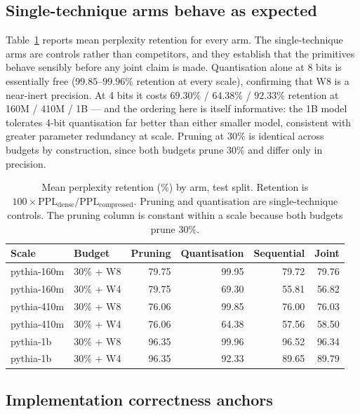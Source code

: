\subsection{Single-technique arms behave as expected}
\label{subsec:singletech}

Table~\ref{tab:retention} reports mean perplexity retention for every arm. The
single-technique arms are controls rather than competitors, and they establish that the
primitives behave sensibly before any joint claim is made. Quantisation alone at 8 bits is
essentially free ($99.85$--$99.96\%$ retention at every scale), confirming that W8 is a
near-inert precision. At 4 bits it costs $69.30\%$ / $64.38\%$ / $92.33\%$ retention at
160M / 410M / 1B --- and the ordering here is itself informative: the 1B model tolerates
4-bit quantisation far better than either smaller model, consistent with greater parameter
redundancy at scale. Pruning at $30\%$ is identical across budgets by construction, since
both budgets prune $30\%$ and differ only in precision.

\begin{table}[t]
\centering
\caption{Mean perplexity retention (\%) by arm, test split. Retention is
$100 \times \mathrm{PPL}_{\mathrm{dense}} / \mathrm{PPL}_{\mathrm{compressed}}$. Pruning and
quantisation are single-technique controls. The pruning column is constant within a scale
because both budgets prune $30\%$.}
\label{tab:retention}
\begin{tabular}{@{}llrrrr@{}}
\toprule
\textbf{Scale} & \textbf{Budget} & \textbf{Pruning} & \textbf{Quantisation} &
\textbf{Sequential} & \textbf{Joint} \\
\midrule
pythia-160m & 30\% + W8 & 79.75 & 99.95 & 79.72 & 79.76 \\
pythia-160m & 30\% + W4 & 79.75 & 69.30 & 55.81 & 56.82 \\
\midrule
pythia-410m & 30\% + W8 & 76.06 & 99.85 & 76.00 & 76.03 \\
pythia-410m & 30\% + W4 & 76.06 & 64.38 & 57.56 & 58.50 \\
\midrule
pythia-1b   & 30\% + W8 & 96.35 & 99.96 & 96.52 & 96.34 \\
pythia-1b   & 30\% + W4 & 96.35 & 92.33 & 89.65 & 89.79 \\
\bottomrule
\end{tabular}
\end{table}

\subsection{Implementation correctness anchors}
\label{subsec:anchors}


